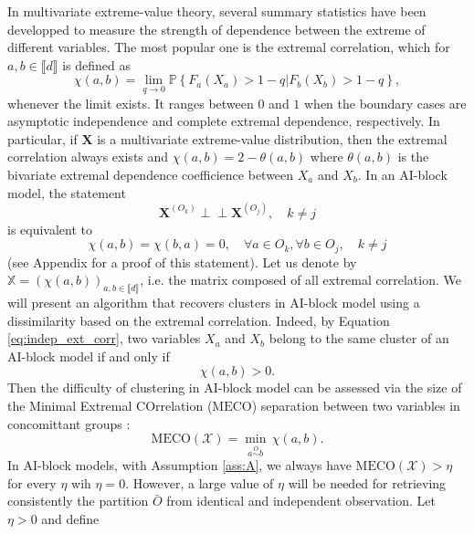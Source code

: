\documentclass[11pt]{article}
\newcommand{\MECO}{\mathrm{MECO}}
\theoremstyle{definition}
\newcommand{\indep}{\perp \!\!\! \perp}
\begin{document}
	In multivariate extreme-value theory, several summary statistics have been developped to measure the strength of dependence between the extreme of different variables. The most popular one is the extremal correlation, which for $a,b \in \llbracket d \rrbracket$ is defined as 
	\begin{equation}
		\label{eq:ext_correlation}
		\chi(a,b) = \underset{q \rightarrow 0}{\lim} \mathbb{P}\left\{ F_a(X_a) > 1-q | F_b(X_b) > 1-q \right\},
	\end{equation}
	whenever the limit exists. It ranges between $0$ and $1$ when the boundary cases are asymptotic independence and complete extremal dependence, respectively. In particular, if $\textbf{X}$ is a multivariate extreme-value distribution, then the extremal correlation always exists and $\chi(a,b) = 2 - \theta(a,b)$ where $\theta(a,b)$ is the bivariate extremal dependence coefficience between $X_a$ and $X_b$. In an AI-block model, the statement
	\begin{equation*}
		\textbf{X}^{(O_k)} \indep \textbf{X}^{(O_j)}, \quad k \neq j
	\end{equation*}
	is equivalent to
	\begin{equation}
		\label{eq:indep_ext_corr}
		\chi(a,b) = \chi(b,a) = 0, \quad \forall a \in O_k, \forall b \in O_j, \quad k \neq j
	\end{equation}
	(see Appendix for a proof of this statement). Let us denote by $\mathbb{X} = (\chi(a,b))_{a,b \in \llbracket d \rrbracket}$, i.e. the matrix composed of all extremal correlation. We will present an algorithm that recovers clusters in AI-block model using a dissimilarity based on the extremal correlation. Indeed, by Equation \eqref{eq:indep_ext_corr}, two variables $X_a$ and $X_b$ belong to the same cluster of an AI-block model if and only if
	\begin{equation*}
	 \chi(a,b) > 0.
	\end{equation*}
	Then the difficulty of clustering in AI-block model can be assessed via the size of the Minimal Extremal COrrelation ($\MECO$) separation between two variables in concomittant groups :
	\begin{equation}
		\label{eq:MECO}
		\MECO(\mathcal{X}) = \underset{a \overset{\bar{O}}{\sim} b}{\min} \, \chi(a,b).
	\end{equation}
	In AI-block models, with Assumption \ref{ass:A}, we always have $\MECO(\mathcal{X}) > \eta$ for every $\eta$ wih $\eta = 0$. However, a large value of $\eta$ will be needed for retrieving consistently the partition $\bar{O}$ from identical and independent observation. Let $\eta > 0$ and define
\end{document}
